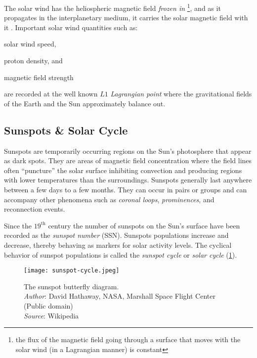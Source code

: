 The solar wind has the heliospheric magnetic field \emph{frozen in} \footnote{the flux of the 
magnetic field going through a surface that moves with the solar wind (in a Lagrangian manner) is 
constant}, and as it propagates in the interplanetary medium, it carries the solar magnetic field 
with it \citep{alfven1942existence,alfven1943existence}. Important solar wind quantities such as: 
%
\begin{enumerate*} 
    \item solar wind speed, 
    \item proton density, and  
    \item magnetic field strength 
\end{enumerate*}
% 
are recorded at the well known $L1$ \emph{Lagrangian point} where the gravitational fields of the 
Earth and the Sun approximately balance out.



\subsection{Sunspots \& Solar Cycle}\label{sec:sunspots}

Sunspots are temporarily occurring regions on the Sun's photosphere that appear as dark spots. 
They are areas of magnetic field concentration where the field lines often \enquote{puncture} the 
solar surface inhibiting convection and producing regions with lower temperatures than the 
surroundings. Sunspots generally last anywhere between a few days to a few months. They can occur 
in pairs or groups and can accompany other phenomena such as \emph{coronal loops}, 
\emph{prominences}, and reconnection events.

Since the $19^{\text{th}}$ century the number of sunspots on the Sun's surface have been recorded 
as the \emph{sunspot number} (SSN). Sunspots populations increase and decrease, thereby behaving as 
markers for solar activity levels. The cyclical behavior of sunspot populations is called the 
\emph{sunspot cycle} or \emph{solar cycle} (\cref{fig:SolarCycle}). 

\begin{figure}
    \noindent\texttt{[image: sunspot-cycle.jpeg]}
    \caption{{\small The sunspot butterfly diagram.  \\ 
    \textit{Author}: David Hathaway, NASA, Marshall Space Flight Center (Public domain) \\ 
    \textit{Source}: Wikipedia}}
    \label{fig:SolarCycle}
\end{figure}

